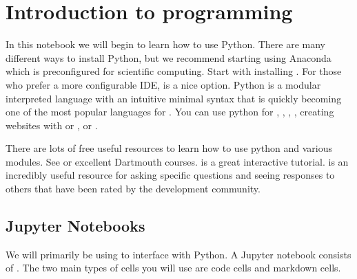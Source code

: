 \documentclass[letterpaper,10pt,english]{sphinxmanual}
\begin{document}
\section{Introduction to programming}
\label{\detokenize{content/Introduction_to_Programming:introduction-to-programming}}\label{\detokenize{content/Introduction_to_Programming::doc}}

In this notebook we will begin to learn how to use Python.  There are many different ways to install Python, but we recommend starting using Anaconda which is preconfigured for scientific computing.  Start with installing .  For those who prefer a more configurable IDE,  is a nice option.  Python is a modular interpreted language with an intuitive minimal syntax that is quickly becoming one of the most popular languages for .  You can use python for , , , , creating websites with  or , or .

There are lots of free useful resources to learn how to use python and various modules.  See  or  excellent Dartmouth courses.   is a great interactive tutorial.   is an incredibly useful resource for asking specific questions and seeing responses to others that have been rated by the development community.



\subsection{Jupyter Notebooks}
\label{\detokenize{content/Introduction_to_Programming:jupyter-notebooks}}
We will primarily be using  to interface with Python.  A Jupyter notebook consists of . The two main types of cells you will use are code cells and markdown cells.
\end{document}
